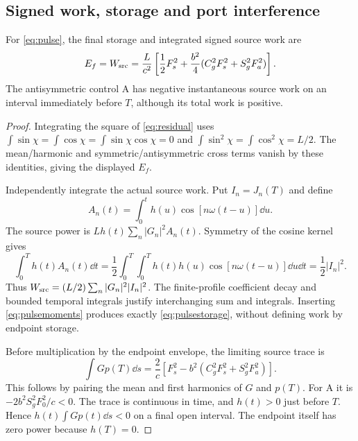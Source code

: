 \subsection{Signed work, storage and port interference}
\begin{proposition}\label{prop:pulsework}
For \eqref{eq:pulse}, the final storage and integrated signed source work are
\begin{equation}\label{eq:pulsestorage}
 E_f=W_{\rm src}=\frac L{c^2}\left[\frac12F_s^2+
 \frac{b^2}{4}(C_g^2F_s^2+S_g^2F_a^2)\right].
\end{equation}
The antisymmetric control A has negative instantaneous source work on an interval immediately before $T$, although its total work is positive.
\end{proposition}
\begin{proof}
Integrating the square of \eqref{eq:residual} uses $\int\sin\chi=\int\cos\chi=\int\sin\chi\cos\chi=0$ and $\int\sin^2\chi=\int\cos^2\chi=L/2$. The mean/harmonic and symmetric/antisymmetric cross terms vanish by these identities, giving the displayed $E_f$.

Independently integrate the actual source work. Put $I_n=J_n(T)$ and define
\[
 A_n(t)=\int_0^t h(u)\cos[n\omega(t-u)]\dd u.
\]
The source power is $Lh(t)\sum_n|G_n|^2A_n(t)$. Symmetry of the cosine kernel gives
\[
 \int_0^T h(t)A_n(t)\dd t
 =\frac12\int_0^T\int_0^T h(t)h(u)\cos[n\omega(t-u)]\dd u\dd t
 =\frac12|I_n|^2.
\]
Thus $W_{\rm src}=(L/2)\sum_n|G_n|^2|I_n|^2$. The finite-profile coefficient decay and bounded temporal integrals justify interchanging sum and integrals. Inserting \eqref{eq:pulsemoments} produces exactly \eqref{eq:pulsestorage}, without defining work by endpoint storage.

Before multiplication by the endpoint envelope, the limiting source trace is
\begin{equation}\label{eq:negativework}
 \int Gp(T)\dd s=\frac2c\left[F_s^2-b^2(C_g^2F_s^2+S_g^2F_a^2)\right].
\end{equation}
This follows by pairing the mean and first harmonics of $G$ and $p(T)$. For A it is $-2b^2S_g^2F_0^2/c<0$. The trace is continuous in time, and $h(t)>0$ just before $T$. Hence $h(t)\int Gp(t)\dd s<0$ on a final open interval. The endpoint itself has zero power because $h(T)=0$.
\end{proof}

